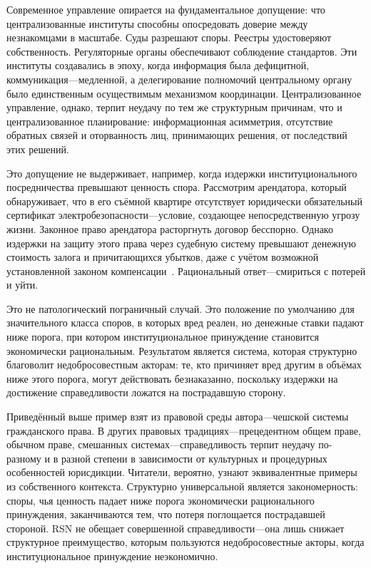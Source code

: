 \documentclass[11pt,a4paper,twocolumn]{article}
\begin{document}
Современное управление опирается на фундаментальное допущение: что централизованные институты способны опосредовать доверие между незнакомцами в масштабе. Суды разрешают споры. Реестры удостоверяют собственность. Регуляторные органы обеспечивают соблюдение стандартов. Эти институты создавались в эпоху, когда информация была дефицитной, коммуникация---медленной, а делегирование полномочий центральному органу было единственным осуществимым механизмом координации. Централизованное управление, однако, терпит неудачу по тем же структурным причинам, что и централизованное планирование: информационная асимметрия, отсутствие обратных связей и оторванность лиц, принимающих решения, от последствий этих решений.

Это допущение не выдерживает, например, когда издержки институционального посредничества превышают ценность спора. Рассмотрим арендатора, который обнаруживает, что в его съёмной квартире отсутствует юридически обязательный сертификат электробезопасности---условие, создающее непосредственную угрозу жизни. Законное право арендатора расторгнуть договор бесспорно. Однако издержки на защиту этого права через судебную систему превышают денежную стоимость залога и причитающихся убытков, даже с учётом возможной установленной законом компенсации~\cite{czcourtfees}. Рациональный ответ---смириться с потерей и уйти.

Это не патологический пограничный случай. Это положение по умолчанию для значительного класса споров, в которых вред реален, но денежные ставки падают ниже порога, при котором институциональное принуждение становится экономически рациональным. Результатом является система, которая структурно благоволит недобросовестным акторам: те, кто причиняет вред другим в объёмах ниже этого порога, могут действовать безнаказанно, поскольку издержки на достижение справедливости ложатся на пострадавшую сторону.

Приведённый выше пример взят из правовой среды автора---чешской системы гражданского права. В других правовых традициях---прецедентном общем праве, обычном праве, смешанных системах---справедливость терпит неудачу по-разному и в разной степени в зависимости от культурных и процедурных особенностей юрисдикции. Читатели, вероятно, узнают эквивалентные примеры из собственного контекста. Структурно универсальной является закономерность: споры, чья ценность падает ниже порога экономически рационального принуждения, заканчиваются тем, что потеря поглощается пострадавшей стороной. RSN не обещает совершенной справедливости---она лишь снижает структурное преимущество, которым пользуются недобросовестные акторы, когда институциональное принуждение неэкономично.
\end{document}
